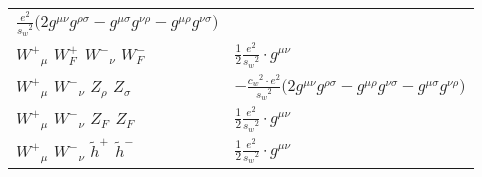 \begin{center}
\begin{tabular}{|l|l|}
	$\frac{ e{}^2 }{ s_w{}^2 }\big(2g^{\mu \nu} g^{\rho \sigma} -g^{\mu \sigma} g^{\nu \rho} -g^{\mu \rho} g^{\nu \sigma} \big)$\\[2mm]
$W^+{}_{\mu }$ \phantom{-} $W^+_F{}_{}$ \phantom{-} $W^-{}_{\nu }$ \phantom{-} $W^-_F{}_{}$ \phantom{-}  &
	$\frac{1}{2}\frac{ e{}^2 }{ s_w{}^2 }\cdot g^{\mu \nu} $\\[2mm]
$W^+{}_{\mu }$ \phantom{-} $W^-{}_{\nu }$ \phantom{-} ${Z}_{\rho }$ \phantom{-} ${Z}_{\sigma }$ \phantom{-}  &
	$-\frac{ c_w{}^2  \cdot e{}^2 }{ s_w{}^2 }\big(2g^{\mu \nu} g^{\rho \sigma} -g^{\mu \rho} g^{\nu \sigma} -g^{\mu \sigma} g^{\nu \rho} \big)$\\[2mm]
$W^+{}_{\mu }$ \phantom{-} $W^-{}_{\nu }$ \phantom{-} $Z_F{}_{}$ \phantom{-} $Z_F{}_{}$ \phantom{-}  &
	$\frac{1}{2}\frac{ e{}^2 }{ s_w{}^2 }\cdot g^{\mu \nu} $\\[2mm]
$W^+{}_{\mu }$ \phantom{-} $W^-{}_{\nu }$ \phantom{-} $\widetilde{h}^+{}_{}$ \phantom{-} $\widetilde{h}^-{}_{}$ \phantom{-}  &
	$\frac{1}{2}\frac{ e{}^2 }{ s_w{}^2 }\cdot g^{\mu \nu} $\\ \hline
\end{tabular}


\end{center}
